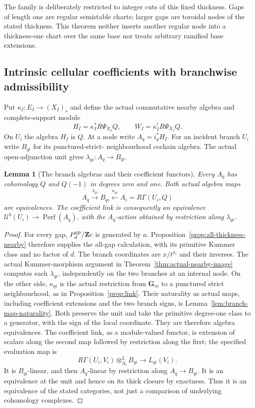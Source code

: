 \documentclass[11pt]{article}
\newtheorem{lemma}[theorem]{Lemma}
\theoremstyle{definition}
\theoremstyle{remark}
\newcommand{\Perf}{\operatorname{Perf}}
\begin{document}
The family is deliberately restricted to integer cuts of this fixed
thickness.  Gaps of length one are regular semistable charts; larger
gaps are toroidal nodes of the stated thickness.  This theorem neither
inserts another regular node into a thickness-one chart over the same
base nor treats arbitrary ramified base extensions.

\subsection{Intrinsic cellular coefficients with branchwise admissibility}
Put $\kappa_I:E_I\to(X_I)_s$ and define the actual commutative
nearby algebra and complete-support module
\[
 H_I=\kappa_I^*R\Psi_{X_I}Q,\qquad
 W_I=\kappa_I^!R\Psi_{X_I}Q.
\]
On $U_i$ the algebra $H_I$ is $Q$.  At a node write $A_q=i_q^*H_I$.
For an incident branch $U_i$ write $B_{qi}$ for its punctured-strict-
neighbourhood cochain algebra.  The actual open-adjunction unit gives
$\lambda_{qi}:A_q\to B_{qi}$.

\begin{lemma}[The branch algebras and their coefficient functors]
\label{lem:branch-algebras}
Every $A_q$ has cohomology $Q$ and $Q(-1)$ in degrees zero and one.
Both actual algebra maps
\[
 A_q\xrightarrow{\lambda_{qi}}B_{qi}
 \xleftarrow{\kappa_{qi}}A_i=R\Gamma(U_i,Q)
\]
are equivalences.  The coefficient link is consequently an equivalence
$\mathcal U^b(U_i)\to\Perf(A_q)$, with the $A_q$-action obtained by
restriction along $\lambda_{qi}$.
\end{lemma}
\begin{proof}
For every gap, $P_d^{\rm gp}/\mathbf Zc$ is generated by $a$.
Proposition~\ref{prop:all-thickness-nearby} therefore supplies the
all-gap calculation, with its primitive Kummer class and no factor of $d$.
The branch coordinates are $x/t^{a_i}$ and their inverses.  The actual
Kummer-morphism argument in Theorem~\ref{thm:actual-nearby-image}
computes each $\lambda_{qi}$, independently on the two branches at
an internal node.  On the other side, $\kappa_{qi}$ is the actual
restriction from $\mathbf G_m$ to a punctured strict neighbourhood,
as in Proposition~\ref{prop:link}.  Their naturality as actual maps,
including coefficient extensions and the two branch signs, is
Lemma~\ref{lem:branch-map-naturality}.  Both preserve the unit and take
the primitive degree-one class to a generator, with the sign of the
local coordinate.  They are therefore algebra equivalences.
The coefficient link, as a module-valued functor, is extension of
scalars along the second map followed by restriction along the first;
the specified evaluation map is
\[
 R\Gamma(U_i,V_i)\otimes^L_{A_i}B_{qi}\longrightarrow L_{qi}(V_i).
\]
It is $B_{qi}$-linear, and then $A_q$-linear by restriction along
$A_q\to B_{qi}$.  It is an equivalence at the unit and hence on
its thick closure by exactness.
Thus it is an equivalence of the stated categories, not just a
comparison of underlying cohomology complexes.
\end{proof}
\end{document}
